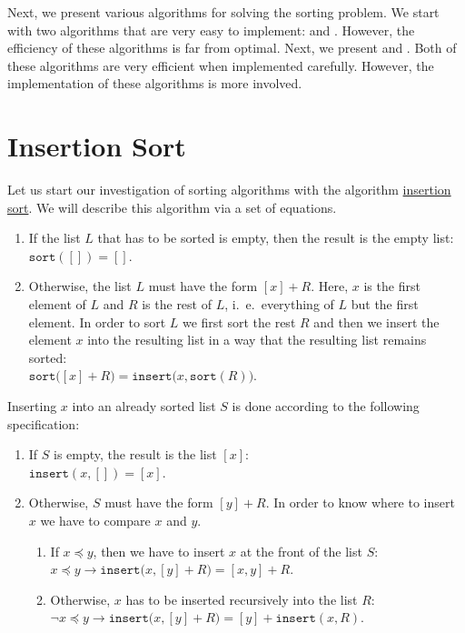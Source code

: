 Next, we present various algorithms for solving the sorting problem.  We start with two algorithms
that are very easy to implement:  and .  However, the
efficiency of these algorithms is far from optimal.  Next, we present  and 
.  Both of these algorithms are very efficient when implemented carefully.
However, the implementation of these algorithms is more involved.


\section{Insertion Sort \label{chap:insertionSort}}
Let us start our investigation of sorting algorithms with the algorithm
\href{http://en.wikipedia.org/wiki/Insertion_sort}{insertion sort}.  We will describe this
algorithm via a set of equations.
\begin{enumerate}
\item If the list $L$ that has to be sorted is empty, then the result is the empty list: 
      \\[0.2cm]
      \hspace*{1.3cm}
      $\mathtt{sort}([]) = []$.
\item Otherwise, the list $L$ must have the form $[x] + R$. Here, $x$ is the first element of $L$
      and $R$ is the rest of $L$, i.~e.~everything of $L$ but the first element.  In order to sort
      $L$ we first sort the rest $R$ and then we insert the element $x$ into the resulting list in a
      way that the resulting list remains sorted:
      \\[0.2cm]
      \hspace*{1.3cm} $\mathtt{sort}\bigl([x] + R\bigr) = \mathtt{insert}\bigl(x, \mathtt{sort}(R)\bigr)$.
\end{enumerate}
Inserting $x$ into an already sorted list $S$ is done according to the following specification:
\begin{enumerate}
\item If $S$ is empty, the result is the list $[x]$: \\[0.2cm]
      \hspace*{1.3cm}
      $\mathtt{insert}(x,[]) = [x]$.
\item Otherwise, $S$ must have the form $[y] + R$.  In order to know where to insert $x$ we have to
      compare $x$ and $y$.
      \begin{enumerate}
      \item If $x \preceq y$, then we have to insert $x$ at the front of the list $S$: \\[0.2cm]
            \hspace*{1.3cm}
            $x \preceq y \rightarrow \mathtt{insert}\bigl(x, [y] + R\bigr) = [x,y] + R$. 
      \item Otherwise, $x$ has to be inserted recursively into the list $R$: \\[0.2cm]
            \hspace*{1.3cm}
            $\neg x \preceq y \rightarrow \mathtt{insert}\bigl(x, [y] + R\bigr) = [y] + \mathtt{insert}(x,R)$. 
      \end{enumerate}
\end{enumerate}

